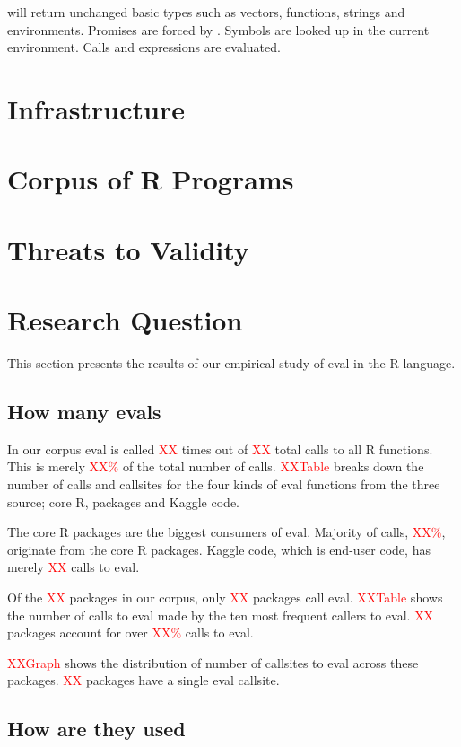 \documentclass[conference]{IEEEtran}
\newcommand{\missingNumber}{\textcolor{red}{XX}\xspace}
\newcommand{\missingPercentage}{\textcolor{red}{XX\%}\xspace}
\newcommand{\missingTable}{\textcolor{red}{XXTable}\xspace}
\newcommand{\missingGraph}{\textcolor{red}{XXGraph}\xspace}
\begin{document}
\eval will return unchanged basic types such as vectors, functions, strings and environments. Promises are forced by \eval. Symbols are looked up in the current environment. Calls and expressions are evaluated. 

\section{Infrastructure}


\section{Corpus of R Programs}


\section{Threats to Validity}


\section{Research Question}
This section presents the results of our empirical study of eval in the R language.
\subsection{How many evals}

In our corpus eval is called \missingNumber times out of \missingNumber
total calls to all R functions. This is merely \missingPercentage of the total
number of calls. \missingTable breaks down the number of calls and callsites for
the four kinds of eval functions from the three source; core R, packages and
Kaggle code.

The core R packages are the biggest consumers of eval. Majority of calls,
\missingPercentage, originate from the core R packages. Kaggle code, which is
end-user code, has merely \missingNumber calls to eval.

Of the \missingNumber packages in our corpus, only \missingNumber packages call
eval. \missingTable shows the number of calls to eval made by the ten most
frequent callers to eval. \missingNumber packages account for over
\missingPercentage calls to eval.

\missingGraph shows the distribution of number of callsites to eval across these
packages. \missingNumber packages have a single eval callsite.


\subsection{How are they used}
\end{document}
